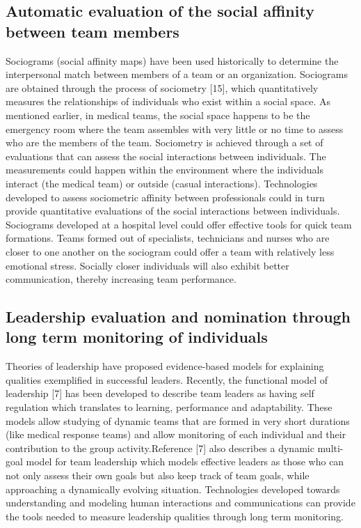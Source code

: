 \documentclass{article} %
\begin{document}
\subsection{Automatic evaluation of the social affinity between team members}
\vspace{-0.13in}
Sociograms (social affinity maps) have been used historically to determine the interpersonal match between members of a team or an organization. Sociograms are obtained through the process of sociometry [15], which quantitatively measures the relationships of individuals who exist within a social space. As mentioned earlier, in medical teams, the social space happens to be the emergency room where the team assembles with very little or no time to assess who are the members of the team. Sociometry is achieved through a set of evaluations that can assess the social interactions between individuals. The measurements could happen within the environment where the individuals interact (the medical team) or outside (casual interactions). Technologies developed to assess sociometric affinity between professionals could in turn provide quantitative evaluations of the social interactions between individuals. Sociograms developed at a hospital level could offer effective tools for quick team formations. Teams formed out of specialists, technicians and nurses who are closer to one another on the sociogram could offer a team with relatively less emotional stress. Socially closer individuals will also exhibit better communication, thereby increasing team performance. 

\vspace{-0.1in}
\subsection{Leadership evaluation and nomination through long term monitoring of individuals}
\vspace{-0.13in}
Theories of leadership have proposed evidence-based models for explaining qualities exemplified in successful leaders. Recently, the functional model of leadership [7] has been developed to describe team leaders as having self regulation which translates to learning, performance and adaptability. These models allow studying of dynamic teams that are formed in very short durations (like medical response teams) and allow monitoring of each individual and their contribution to the group activity.Reference [7] also describes a dynamic multi-goal model for team leadership which models effective leaders as those who can not only assess their own goals but also keep track of team goals, while approaching a dynamically evolving situation. Technologies developed towards understanding and modeling human interactions and communications can provide the tools needed to measure leadership qualities through long term monitoring.
\end{document}
